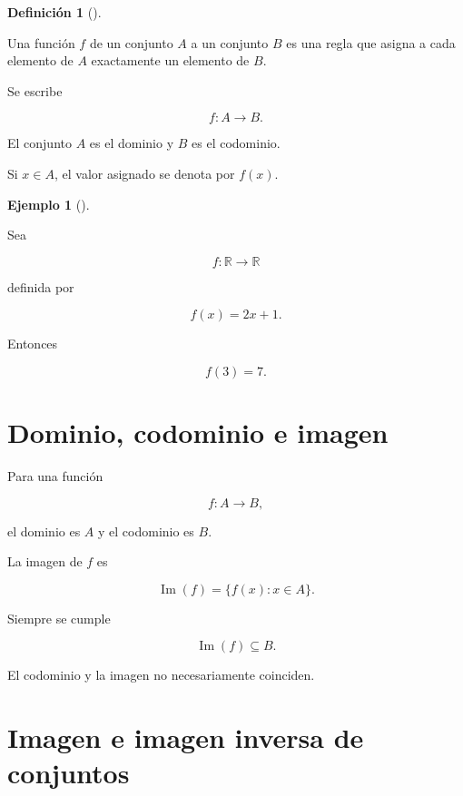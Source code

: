 \documentclass[
  spanish,
  10.5pt,
  letterpaper,
  DIV=11,
  numbers=noendperiod,
  oneside,
  open=any]{scrreprt}
\theoremstyle{definition}
\newtheorem{definition}{Definición}[chapter]
\theoremstyle{definition}
\newtheorem{example}{Ejemplo}[chapter]
\theoremstyle{plain}
\theoremstyle{remark}
\begin{document}

\begin{definition}[]\protect\hypertarget{def-funcion}{}\label{def-funcion}

Una función \(f\) de un conjunto \(A\) a un conjunto \(B\) es una regla
que asigna a cada elemento de \(A\) exactamente un elemento de \(B\).

\end{definition}

Se escribe

\[
f:A\longrightarrow B.
\]

El conjunto \(A\) es el dominio y \(B\) es el codominio.

Si \(x\in A\), el valor asignado se denota por \(f(x)\).

\begin{example}[]\protect\hypertarget{exm-funcion-real}{}\label{exm-funcion-real}

Sea

\[
f:\mathbb{R}\longrightarrow\mathbb{R}
\]

definida por

\[
f(x)=2x+1.
\]

Entonces

\[
f(3)=7.
\]

\end{example}

\section*{Dominio, codominio e imagen}\label{dominio-codominio-e-imagen}


Para una función

\[
f:A\to B,
\]

el dominio es \(A\) y el codominio es \(B\).

La imagen de \(f\) es

\[
\operatorname{Im}(f)
=
\{f(x):x\in A\}.
\]

Siempre se cumple

\[
\operatorname{Im}(f)\subseteq B.
\]

El codominio y la imagen no necesariamente coinciden.

\section*{Imagen e imagen inversa de
conjuntos}\label{imagen-e-imagen-inversa-de-conjuntos}
\end{document}

